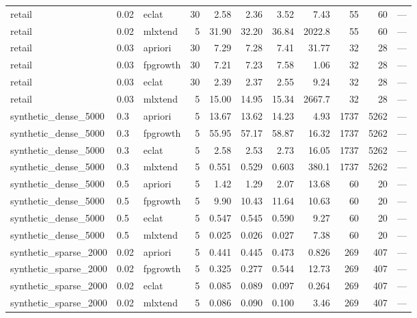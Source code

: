 \documentclass[journal,a4paper]{IEEEtran}
\begin{document}
\begin{longtable}{p{3.0cm}llrrrrrrrp{2.4cm}}
retail & 0.02 & eclat & 30 & 2.58 & 2.36 & 3.52 & 7.43 & 55 & 60 & --- \\
retail & 0.02 & mlxtend & 5 & 31.90 & 32.20 & 36.84 & 2022.8 & 55 & 60 & --- \\
retail & 0.03 & apriori & 30 & 7.29 & 7.28 & 7.41 & 31.77 & 32 & 28 & --- \\
retail & 0.03 & fpgrowth & 30 & 7.21 & 7.23 & 7.58 & 1.06 & 32 & 28 & --- \\
retail & 0.03 & eclat & 30 & 2.39 & 2.37 & 2.55 & 9.24 & 32 & 28 & --- \\
retail & 0.03 & mlxtend & 5 & 15.00 & 14.95 & 15.34 & 2667.7 & 32 & 28 & --- \\
synthetic\_\allowbreak{}dense\_\allowbreak{}5000 & 0.3 & apriori & 5 & 13.67 & 13.62 & 14.23 & 4.93 & 1737 & 5262 & --- \\
synthetic\_\allowbreak{}dense\_\allowbreak{}5000 & 0.3 & fpgrowth & 5 & 55.95 & 57.17 & 58.87 & 16.32 & 1737 & 5262 & --- \\
synthetic\_\allowbreak{}dense\_\allowbreak{}5000 & 0.3 & eclat & 5 & 2.58 & 2.53 & 2.73 & 16.05 & 1737 & 5262 & --- \\
synthetic\_\allowbreak{}dense\_\allowbreak{}5000 & 0.3 & mlxtend & 5 & 0.551 & 0.529 & 0.603 & 380.1 & 1737 & 5262 & --- \\
synthetic\_\allowbreak{}dense\_\allowbreak{}5000 & 0.5 & apriori & 5 & 1.42 & 1.29 & 2.07 & 13.68 & 60 & 20 & --- \\
synthetic\_\allowbreak{}dense\_\allowbreak{}5000 & 0.5 & fpgrowth & 5 & 9.90 & 10.43 & 11.64 & 10.63 & 60 & 20 & --- \\
synthetic\_\allowbreak{}dense\_\allowbreak{}5000 & 0.5 & eclat & 5 & 0.547 & 0.545 & 0.590 & 9.27 & 60 & 20 & --- \\
synthetic\_\allowbreak{}dense\_\allowbreak{}5000 & 0.5 & mlxtend & 5 & 0.025 & 0.026 & 0.027 & 7.38 & 60 & 20 & --- \\
synthetic\_\allowbreak{}sparse\_\allowbreak{}2000 & 0.02 & apriori & 5 & 0.441 & 0.445 & 0.473 & 0.826 & 269 & 407 & --- \\
synthetic\_\allowbreak{}sparse\_\allowbreak{}2000 & 0.02 & fpgrowth & 5 & 0.325 & 0.277 & 0.544 & 12.73 & 269 & 407 & --- \\
synthetic\_\allowbreak{}sparse\_\allowbreak{}2000 & 0.02 & eclat & 5 & 0.085 & 0.089 & 0.097 & 0.264 & 269 & 407 & --- \\
synthetic\_\allowbreak{}sparse\_\allowbreak{}2000 & 0.02 & mlxtend & 5 & 0.086 & 0.090 & 0.100 & 3.46 & 269 & 407 & --- \\

\end{longtable}
\end{document}
